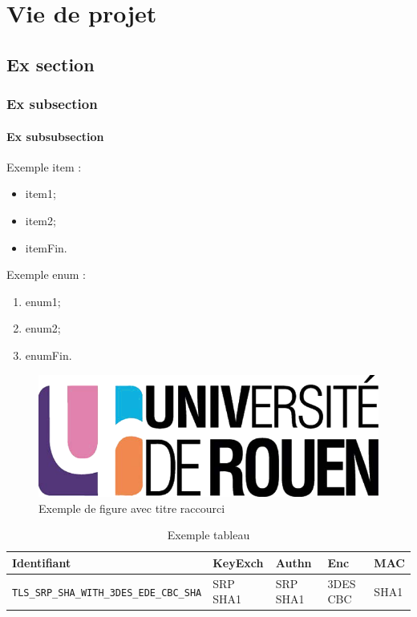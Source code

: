 \chapter{Vie de projet}

\section{Ex section}
\subsection{Ex subsection}
\subsubsection{Ex subsubsection}


Exemple item  :
\begin{itemize}
\item item1;
\item item2;
\item itemFin.\\
\end{itemize}

Exemple enum : 
\begin{enumerate}
\item enum1;
\item enum2;
\item enumFin.\\
\end{enumerate}


\begin{figure}[H]
\begin{center}
\includegraphics[scale=0.2]{images/logo_univ.png}
\end{center}
\caption[Exemple 1]{Exemple de figure avec titre raccourci}
\label{fig1}
\end{figure}


\begin{table}
\centering
\begin{tabularx}{17cm}{|l|l|l|X|l|}
\hline
\textbf{Identifiant} & \textbf{KeyExch} & \textbf{Authn}& \textbf{Enc}& \textbf{MAC}\\
\hline
\verb+TLS_SRP_SHA_WITH_3DES_EDE_CBC_SHA+&SRP SHA1&SRP SHA1&3DES CBC&SHA1\\
\hline
\end{tabularx}
\caption{Exemple tableau}
\label{tableauEx}
\end{table}

